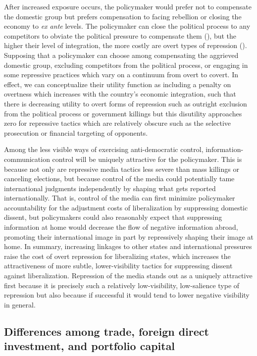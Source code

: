 \documentclass[12pt]{report}
\begin{document}
After increased exposure occurs, the policymaker would prefer not to compensate the domestic group
but prefers compensation to facing rebellion or closing the economy to \textit{ex ante} levels. The
policymaker can close the political process to any competitors to obviate the political pressure to
compensate them (\citealt{Adsera:2002vt}), but the higher their level of integration, the more
costly are overt types of repression (\citealt{Levitsky:2002gx}). Supposing that a policymaker can
choose among compensating the aggrieved domestic group, excluding competitors from the political
process, or engaging in some repressive practices which vary on a continuum from overt to covert. In
effect, we can conceptualize their utility function as including a penalty on overtness which
increases with the country's economic integration, such that there is decreasing utility to overt
forms of repression such as outright exclusion from the political process or government killings but
this disutility approaches zero for repressive tactics which are relatively obscure such as the
selective prosecution or financial targeting of opponents.

Among the less visible ways of exercising anti-democratic control, information-communication control
will be uniquely attractive for the policymaker. This is because not only are repressive media
tactics less severe than mass killings or canceling elections, but because control of the media
could potentially tame international judgments independently by shaping what gets reported
internationally. That is, control of the media can first minimize policymaker accountability for the
adjustment costs of liberalization by suppressing domestic dissent, but policymakers could also
reasonably expect that suppressing information at home would decrease the flow of negative
information abroad, promoting their international image in part by repressively shaping their image
at home. In summary, increasing linkages to other states and international pressures raise the cost
of overt repression for liberalizing states, which increases the attractiveness of more subtle,
lower-visibility tactics for suppressing dissent against liberalization. Repression of the media
stands out as a uniquely attractive first because it is precisely such a relatively low-visibility,
low-salience type of repression but also because if successful it would tend to lower negative
visibility in general.

\subsection{Differences among trade, foreign direct investment, and portfolio capital}
\end{document}
